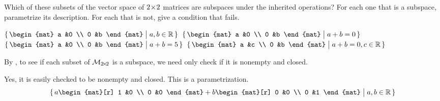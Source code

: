 \begin{exercises}
  \recommended \item
    Which of these subsets of the vector space of \( 2 \! \times \! 2 \) matrices
    are subspaces under the inherited operations?
    For each one that is a subspace, parametrize its description.
    For each that is not, give a condition that fails.
    \begin{exparts}
      \partsitem \( \set{\begin{mat}
                      a  &0  \\
                      0  &b
                    \end{mat}  \suchthat a,b\in\Re}  \)
      \partsitem \( \set{\begin{mat}
                      a  &0  \\
                      0  &b
                    \end{mat}  \suchthat a+b=0} \)
      \partsitem \( \set{\begin{mat}
                      a  &0  \\
                      0  &b
                    \end{mat}  \suchthat a+b=5} \)
      \partsitem \( \set{\begin{mat}
                      a  &c  \\
                      0  &b
                    \end{mat}  \suchthat a+b=0, c\in\Re} \)
    \end{exparts}
    \begin{answer}
      By , to see if each
      subset of $\mathcal{M}_{2 \! \times \! 2}$ is a subspace, we need only
      check if it is nonempty and closed.
      \begin{exparts}
        \partsitem Yes, it is easily checked to be nonempty and closed.
          This is a parametrization.
          \begin{equation*}
            \set{a\begin{mat}[r]
                    1  &0  \\
                    0  &0
                  \end{mat}
                 +b\begin{mat}[r]
                    0  &0  \\
                    0  &1  
                   \end{mat}
                 \suchthat a,b\in\Re}
          \end{equation*}

\end{exparts}
\end{answer}
\end{exercises}
